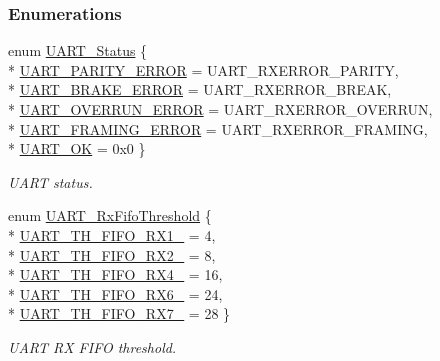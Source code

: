 \subsubsection*{Enumerations}
\begin{DoxyCompactItemize}
\item 
enum \hyperlink{_u_a_r_t_c_c26_x_x_8h_a778bbef5f4b52a5651552136715f53c4}{U\-A\-R\-T\-\_\-\-Status} \{ \\*
\hyperlink{_u_a_r_t_c_c26_x_x_8h_a778bbef5f4b52a5651552136715f53c4a505840052f6bf71374b427575c23e929}{U\-A\-R\-T\-\_\-\-P\-A\-R\-I\-T\-Y\-\_\-\-E\-R\-R\-O\-R} = U\-A\-R\-T\-\_\-\-R\-X\-E\-R\-R\-O\-R\-\_\-\-P\-A\-R\-I\-T\-Y, 
\\*
\hyperlink{_u_a_r_t_c_c26_x_x_8h_a778bbef5f4b52a5651552136715f53c4aeadc3b97f933501a079b1f300a92a01a}{U\-A\-R\-T\-\_\-\-B\-R\-A\-K\-E\-\_\-\-E\-R\-R\-O\-R} = U\-A\-R\-T\-\_\-\-R\-X\-E\-R\-R\-O\-R\-\_\-\-B\-R\-E\-A\-K, 
\\*
\hyperlink{_u_a_r_t_c_c26_x_x_8h_a778bbef5f4b52a5651552136715f53c4a261d411fd495e2312aad0c43a01fc050}{U\-A\-R\-T\-\_\-\-O\-V\-E\-R\-R\-U\-N\-\_\-\-E\-R\-R\-O\-R} = U\-A\-R\-T\-\_\-\-R\-X\-E\-R\-R\-O\-R\-\_\-\-O\-V\-E\-R\-R\-U\-N, 
\\*
\hyperlink{_u_a_r_t_c_c26_x_x_8h_a778bbef5f4b52a5651552136715f53c4a2e97f20086d32b1d2c9f276351bcc100}{U\-A\-R\-T\-\_\-\-F\-R\-A\-M\-I\-N\-G\-\_\-\-E\-R\-R\-O\-R} = U\-A\-R\-T\-\_\-\-R\-X\-E\-R\-R\-O\-R\-\_\-\-F\-R\-A\-M\-I\-N\-G, 
\\*
\hyperlink{_u_a_r_t_c_c26_x_x_8h_a778bbef5f4b52a5651552136715f53c4a525187963c0aaa465f2a35b30b894d07}{U\-A\-R\-T\-\_\-\-O\-K} = 0x0
 \}
\begin{DoxyCompactList}\small\item\em U\-A\-R\-T status. \end{DoxyCompactList}\item 
enum \hyperlink{_u_a_r_t_c_c26_x_x_8h_ae4d3bdbfa5106a07c6965f3fe40f8c8a}{U\-A\-R\-T\-\_\-\-Rx\-Fifo\-Threshold} \{ \\*
\hyperlink{_u_a_r_t_c_c26_x_x_8h_ae4d3bdbfa5106a07c6965f3fe40f8c8aaf6438a9dadb7b6deda6fad9313589e54}{U\-A\-R\-T\-\_\-\-T\-H\-\_\-\-F\-I\-F\-O\-\_\-\-R\-X1\-\_} = 4, 
\\*
\hyperlink{_u_a_r_t_c_c26_x_x_8h_ae4d3bdbfa5106a07c6965f3fe40f8c8aad134d6bcd232955d27154c1848e0183c}{U\-A\-R\-T\-\_\-\-T\-H\-\_\-\-F\-I\-F\-O\-\_\-\-R\-X2\-\_} = 8, 
\\*
\hyperlink{_u_a_r_t_c_c26_x_x_8h_ae4d3bdbfa5106a07c6965f3fe40f8c8aa5487444d217fb1871e1c26f372fa2037}{U\-A\-R\-T\-\_\-\-T\-H\-\_\-\-F\-I\-F\-O\-\_\-\-R\-X4\-\_} = 16, 
\\*
\hyperlink{_u_a_r_t_c_c26_x_x_8h_ae4d3bdbfa5106a07c6965f3fe40f8c8aa78a463faac42495d55a90f2badf1b04f}{U\-A\-R\-T\-\_\-\-T\-H\-\_\-\-F\-I\-F\-O\-\_\-\-R\-X6\-\_} = 24, 
\\*
\hyperlink{_u_a_r_t_c_c26_x_x_8h_ae4d3bdbfa5106a07c6965f3fe40f8c8aa6abc554300123e6420c7de4f838e07bf}{U\-A\-R\-T\-\_\-\-T\-H\-\_\-\-F\-I\-F\-O\-\_\-\-R\-X7\-\_} = 28
 \}
\begin{DoxyCompactList}\small\item\em U\-A\-R\-T R\-X F\-I\-F\-O threshold. \end{DoxyCompactList}\end{DoxyCompactItemize}

